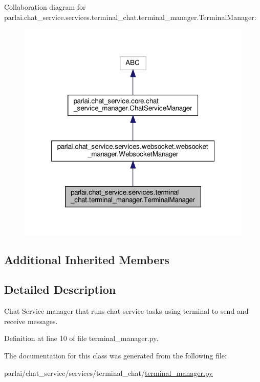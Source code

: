 Collaboration diagram for parlai.\+chat\+\_\+service.\+services.\+terminal\+\_\+chat.\+terminal\+\_\+manager.\+Terminal\+Manager\+:
\nopagebreak
\begin{figure}[H]
\begin{center}
\leavevmode
\includegraphics[width=319pt]{dd/d78/classparlai_1_1chat__service_1_1services_1_1terminal__chat_1_1terminal__manager_1_1TerminalManager__coll__graph}
\end{center}
\end{figure}
\subsection*{Additional Inherited Members}


\subsection{Detailed Description}
\begin{DoxyVerb}Chat Service manager that runs chat service tasks using terminal to send and receive
messages.
\end{DoxyVerb}
 

Definition at line 10 of file terminal\+\_\+manager.\+py.



The documentation for this class was generated from the following file\+:\begin{DoxyCompactItemize}
\item 
parlai/chat\+\_\+service/services/terminal\+\_\+chat/\hyperlink{terminal__manager_8py}{terminal\+\_\+manager.\+py}\end{DoxyCompactItemize}

